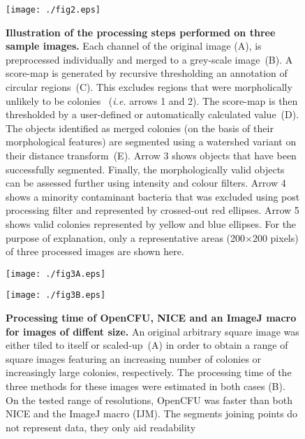 \documentclass[10pt]{article}
\newcommand{\IJM}{IJM}
\begin{document}
\newpage{}

\begin{figure}[!ht]
\begin{center}
 \texttt{[image: ./fig2.eps]}
\end{center}
\caption{{\bf Illustration of the processing steps performed on three sample images.}
Each channel of the original image (A), is preprocessed individually and merged
to a grey-scale image~(B).
A score-map is generated by recursive thresholding an annotation of circular regions~(C). 
This excludes regions that were morpholically unlikely to be colonies~
(\emph{i.e.} arrows 1 and 2).
The score-map is then thresholded by a user-defined or automatically calculated
value~(D).
The objects identified as merged colonies (on the basis of their morphological
features) are segmented using a watershed variant on their distance transform~(E).
Arrow 3 shows objects that have been successfully segmented. Finally, the morphologically valid objects can be assessed further using intensity and colour filters.
Arrow 4 shows a minority contaminant bacteria that was excluded using post processing filter and represented by crossed-out red ellipses. 
Arrow 5 shows valid colonies represented by yellow and blue ellipses.
For the purpose of explanation, only a representative areas (200$\times{}$200 pixels)
of three processed images are shown here.}
\label{figPipeline}
\end{figure}

\newpage{}


\begin{figure}[!ht]

\begin{center}
\texttt{[image: ./fig3A.eps]}\\
\end{center}
\begin{center}
\texttt{[image: ./fig3B.eps]}
\end{center}
\caption{{\bf Processing time of OpenCFU, NICE\cite{clarke_lowcost_2010} and an ImageJ macro\cite{cai_optimized_2011} for images of
diffent size.} An original arbitrary square image was either tiled to itself
or scaled-up~(A) in order to obtain a range of square images featuring an
increasing number of colonies or increasingly large colonies, respectively. The
processing time of the three methods for these images were estimated in both cases (B).
On the tested range of resolutions, OpenCFU was faster than both NICE and the ImageJ macro (\IJM). 
The segments joining points do not represent data, they only aid readability}
\label{figSpeed}
\end{figure}
\end{document}
